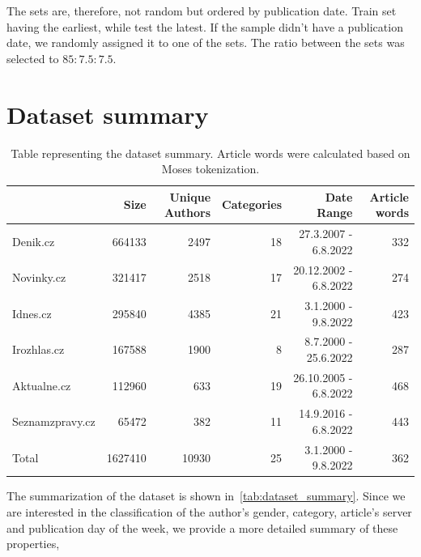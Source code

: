 The sets are, therefore, not random but ordered by publication date. Train set having the earliest, while test the latest.
If the sample didn't have a publication date, we randomly assigned it to one of the sets.
The ratio between the sets was selected to $85:7.5:7.5$.
\section{Dataset summary}
\begin{table}[h]
    \centering\footnotesize\sf
    \begin{tabular}{lrrrrr}
        \toprule
        {}              & Size    & Unique Authors & Categories & Date Range            & Article words \\
        \midrule
        Denik.cz        & 664133  & 2497           & 18         & 27.3.2007 - 6.8.2022  & 332           \\
        Novinky.cz      & 321417  & 2518           & 17         & 20.12.2002 - 6.8.2022 & 274           \\
        Idnes.cz        & 295840  & 4385           & 21         & 3.1.2000 - 9.8.2022   & 423           \\
        Irozhlas.cz     & 167588  & 1900           & 8          & 8.7.2000 - 25.6.2022  & 287           \\
        Aktualne.cz     & 112960  & 633            & 19         & 26.10.2005 - 6.8.2022 & 468           \\
        Seznamzpravy.cz & 65472   & 382            & 11         & 14.9.2016 - 6.8.2022  & 443           \\
        \midrule
        Total           & 1627410 & 10930          & 25         & 3.1.2000 - 9.8.2022   & 362           \\
        \bottomrule
    \end{tabular}
    \caption{Table representing the dataset summary. Article words were calculated based on Moses tokenization.}
    \label{tab:dataset_summary}
\end{table}
The summarization of the dataset is shown in~\autoref{tab:dataset_summary}.
Since we are interested in the classification of the author's gender, category,
article's server and publication day of the week, we provide a more detailed summary of these properties,

